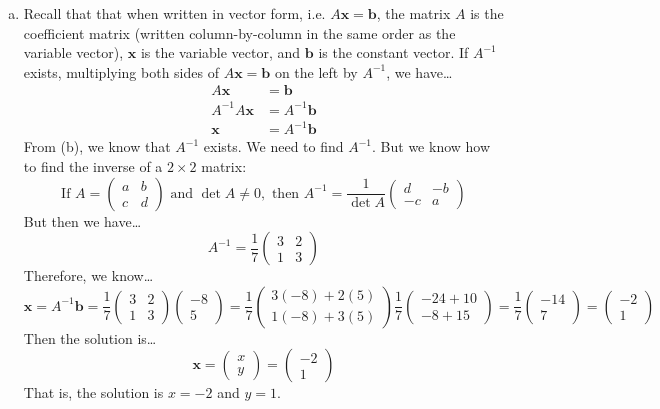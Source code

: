 \documentclass[11pt,letterpaper]{article}
\begin{document}
\begin{enumerate}[(a)]
\item Recall that that when written in vector form, i.e. $A\mathbf{x}= \mathbf{b}$, the matrix $A$ is the coefficient matrix (written column-by-column in the same order as the variable vector), $\mathbf{x}$ is the variable vector, and $\mathbf{b}$ is the constant vector. If $A^{-1}$ exists, multiplying both sides of $A\mathbf{x}= \mathbf{b}$ on the left by $A^{-1}$, we have\dots
	\[
	\begin{aligned}
	A\mathbf{x}&= \mathbf{b} \\[0.3cm]
	A^{-1}A \mathbf{x}&= A^{-1} \mathbf{b} \\[0.3cm]
	\mathbf{x}&= A^{-1} \mathbf{b}
	\end{aligned}
	\]
From (b), we know that $A^{-1}$ exists. We need to find $A^{-1}$. But we know how to find the inverse of a $2 \times 2$ matrix:
	\[
	\text{If } A= \begin{pmatrix} a & b \\ c & d \end{pmatrix} \text{ and } \det A \neq 0, \text{ then } A^{-1}= \dfrac{1}{\det A} \begin{pmatrix} d & -b \\ -c & a \end{pmatrix}
	\]
But then we have\dots
	\[
	A^{-1}= \dfrac{1}{7} \begin{pmatrix} 3 & 2 \\ 1 & 3 \end{pmatrix}
	\]
Therefore, we know\dots
	\[
	\mathbf{x}= A^{-1} \mathbf{b}= \dfrac{1}{7} \begin{pmatrix} 3 & 2 \\ 1 & 3 \end{pmatrix} \begin{pmatrix} -8 \\ 5 \end{pmatrix}= \dfrac{1}{7} \begin{pmatrix} 3(-8) + 2(5) \\ 1(-8) + 3(5) \end{pmatrix} \dfrac{1}{7} \begin{pmatrix} -24 + 10 \\ -8 + 15 \end{pmatrix}= \dfrac{1}{7} \begin{pmatrix} -14 \\ 7 \end{pmatrix}= \begin{pmatrix} -2 \\ 1 \end{pmatrix}
	\]
Then the solution is\dots
	\[
	\mathbf{x}= \begin{pmatrix} x \\ y \end{pmatrix}= \begin{pmatrix} -2 \\ 1 \end{pmatrix}
	\]
That is, the solution is $x= -2$ and $y= 1$. 
\end{enumerate}
\end{document}
